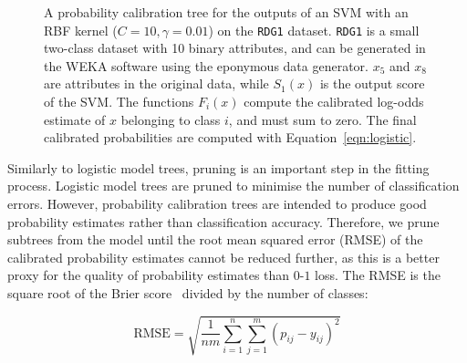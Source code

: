 \documentclass[wcp]{jmlr}
\begin{document}
\begin{figure}[t]
	\caption{\label{fig:pct}A probability calibration tree for the outputs of an SVM with an RBF kernel ($C = 10, \gamma = 0.01$) on the \texttt{RDG1} dataset. \texttt{RDG1} is a small two-class dataset with 10 binary attributes, and can be generated in the WEKA software using the eponymous data generator. $x_5$ and $x_8$ are attributes in the original data, while $S_1(x)$ is the output score of the SVM. The functions $F_i(x)$ compute the calibrated log-odds estimate of $x$ belonging to class $i$, and must sum to zero. The final calibrated probabilities are computed with Equation~\ref{eqn:logistic}.}	
\end{figure}
	
Similarly to logistic model trees, pruning is an important step in the fitting process. Logistic model trees are pruned to minimise the number of classification errors. However, probability calibration trees are intended to produce good probability estimates rather than classification accuracy. Therefore, we prune subtrees from the model until the root mean squared error (RMSE) of the calibrated probability estimates cannot be reduced further, as this is a better proxy for the quality of probability estimates than $0$-$1$ loss. The RMSE is the square root of the Brier score~\citep{brier1950verification} divided by the number of classes:

\begin{equation}
	\textrm{RMSE} = \sqrt{\frac{1}{nm}\sum_{i=1}^n \sum_{j=1}^m (p_{ij} - y_{ij})^2 }
\end{equation}
\end{document}
